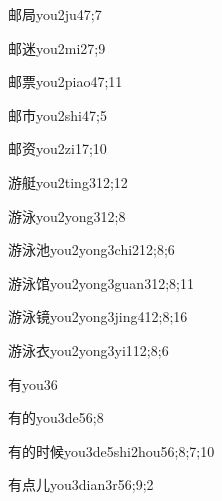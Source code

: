 \begin{verbete}{邮局}{you2ju4}{7;7}
\end{verbete}
\begin{verbete}{邮迷}{you2mi2}{7;9}
\end{verbete}
\begin{verbete}{邮票}{you2piao4}{7;11}
\end{verbete}
\begin{verbete}{邮市}{you2shi4}{7;5}
\end{verbete}
\begin{verbete}{邮资}{you2zi1}{7;10}
\end{verbete}
\begin{verbete}{游艇}{you2ting3}{12;12}
\end{verbete}
\begin{verbete}{游泳}{you2yong3}{12;8}
\end{verbete}
\begin{verbete}{游泳池}{you2yong3chi2}{12;8;6}
\end{verbete}
\begin{verbete}{游泳馆}{you2yong3guan3}{12;8;11}
\end{verbete}
\begin{verbete}{游泳镜}{you2yong3jing4}{12;8;16}
\end{verbete}
\begin{verbete}{游泳衣}{you2yong3yi1}{12;8;6}
\end{verbete}
\begin{verbete}{有}{you3}{6}
\end{verbete}
\begin{verbete}{有的}{you3de5}{6;8}
\end{verbete}
\begin{verbete}{有的时候}{you3de5shi2hou5}{6;8;7;10}
\end{verbete}
\begin{verbete}{有点儿}{you3dian3r5}{6;9;2}
\end{verbete}
